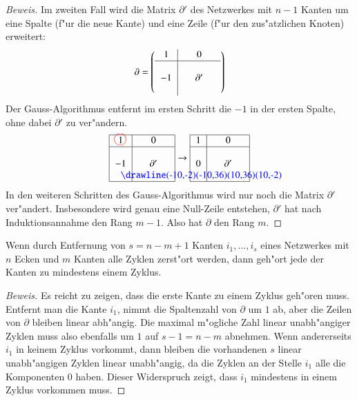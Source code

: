 \begin{proof}[Beweis]
Im zweiten Fall wird die Matrix $\partial'$ des Netzwerkes mit
$n-1$ Kanten um eine Spalte (f"ur die neue Kante) und eine
Zeile (f"ur den zus"atzlichen Knoten) erweitert:
\[
\partial=
\left(
\begin{tabular}{>{$}c<{$}|>{$}c<{$}>{$}c<{$}>{$}c<{$}}
1& &0 & \\
\hline
& & & \\
-1& &\partial'& \\
&& &\\
\end{tabular}
\right)
\]
Der Gauss-Algorithmus entfernt im ersten Schritt die $-1$ in
der ersten Spalte, ohne dabei $\partial'$ zu ver"andern.
\[
\begin{tabular}{|>{$}c<{$}|>{$}c<{$}>{$}c<{$}>{$}c<{$}|}
\hline
1%
\begin{picture}(0,0)
\color{red}\put(-3,4){\circle{12}}
\end{picture}%
& &0 & \\
\hline
& & & \\
-1& &\partial'& \\
\begin{picture}(0,0)
\color{blue}\drawline(-10,-2)(-10,36)(10,36)(10,-2)
\end{picture}%
&& &\\
\hline
\end{tabular}
\rightarrow
\begin{tabular}{|>{$}c<{$}|>{$}c<{$}>{$}c<{$}>{$}c<{$}|}
\hline
1& &0 & \\
\hline
& & & \\
0& &\partial'& \\
&& &\\
\hline
\end{tabular}
\]
In den weiteren Schritten des Gauss-Algorithmus wird nur noch
die Matrix $\partial'$ ver"andert.
Insbesondere wird genau eine Null-Zeile entstehen, $\partial'$
hat nach Induktionsannahme den Rang $m-1$. Also hat $\partial$
den Rang $m$.
\end{proof}

\begin{satz}
Wenn durch Entfernung von $s=n-m+1$ Kanten $i_1,\dots,i_s$
eines Netzwerkes mit $n$ Ecken und $m$ Kanten alle Zyklen zerst"ort werden,
dann geh"ort jede der Kanten zu mindestens einem Zyklus.
\end{satz}

\begin{proof}[Beweis]
Es reicht zu zeigen, dass die erste Kante zu einem Zyklus geh"oren
muss. Entfernt man die Kante $i_1$, nimmt die Spaltenzahl von $\partial$
um $1$ ab, aber die Zeilen von $\partial$ bleiben linear abh"angig.
Die maximal m"ogliche Zahl linear unabh"angiger Zyklen muss also
ebenfalls um $1$ auf $s-1=n-m$ abnehmen.
Wenn andererseits $i_1$ in keinem Zyklus vorkommt, dann
bleiben die vorhandenen $s$ linear unabh"angigen Zyklen linear unabh"angig,
da die Zyklen an der Stelle $i_1$ alle die Komponenten $0$ haben.
Dieser Widerspruch zeigt, dass $i_1$ mindestens in einem Zyklus vorkommen
muss.
\end{proof}

